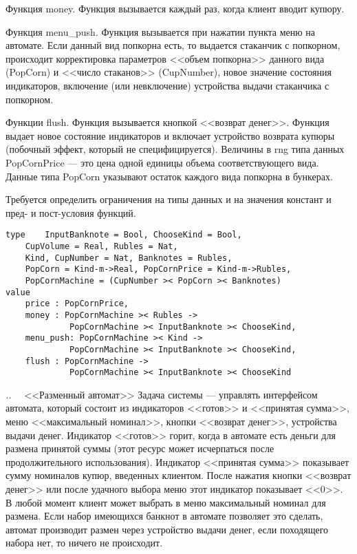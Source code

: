 \documentclass[14pt, twoside]{extreport}
\newcounter{problem_type}[chapter]
\newcounter{zadacha}[problem_type]
\newcommand{\z}{\vspace{0.5cm}\par\addtocounter{zadacha}{1}%
\textit{\arabic{chapter}.\arabic{problem_type}.\arabic{zadacha}}~~  }
\begin{document}
Функция money. Функция вызывается каждый раз, когда клиент вводит купюру.

Функция menu\_push. Функция вызывается при нажатии пункта меню на автомате. Если данный вид попкорна есть, то выдается стаканчик с попкорном, происходит корректировка параметров <<объем попкорна>> данного вида (PopCorn) и <<число стаканов>> (CupNumber), новое значение состояния индикаторов, включение (или невключение) устройства выдачи стаканчика с попкорном.

Функции flush. Функция вызывается кнопкой <<возврат денег>>. Функция выдает новое состояние индикаторов и включает устройство возврата купюры (побочный эффект, который не специфицируется).
Величины в rng типа данных PopCornPrice --- это цена одной единицы объема соответствующего вида. Данные типа PopCorn указывают остаток каждого вида попкорна в бункерах.

Требуется определить ограничения на типы данных и на значения констант и пред- и пост-условия функций.

\begin{lstlisting}
type	InputBanknote = Bool, ChooseKind = Bool,
    CupVolume = Real, Rubles = Nat,
	Kind, CupNumber = Nat, Banknotes = Rubles,
    PopCorn = Kind-m->Real, PopCornPrice = Kind-m->Rubles,
    PopCornMachine = (CupNumber >< PopCorn >< Banknotes)
value
	price : PopCornPrice, 	
	money : PopCornMachine >< Rubles ->
             PopCornMachine >< InputBanknote >< ChooseKind,
	menu_push: PopCornMachine >< Kind ->
             PopCornMachine >< InputBanknote >< ChooseKind,
	flush : PopCornMachine ->
             PopCornMachine >< InputBanknote >< ChooseKind
\end{lstlisting}

\z <<Разменный автомат>> Задача системы --- управлять интерфейсом автомата, который состоит из индикаторов <<готов>> и <<принятая сумма>>, меню <<максимальный номинал>>, кнопки <<возврат денег>>, устройства выдачи денег. Индикатор <<готов>> горит, когда в автомате есть деньги для размена принятой суммы (этот ресурс может исчерпаться после продолжительного использования). Индикатор <<принятая сумма>> показывает сумму номиналов купюр, введенных клиентом. После нажатия кнопки <<возврат денег>> или после удачного выбора меню этот индикатор показывает <<0>>. В любой момент клиент может выбрать в меню максимальный номинал для размена. Если набор имеющихся банкнот в автомате позволяет это сделать, автомат производит размен через устройство выдачи денег, если походящего набора нет, то ничего не происходит.
\end{document}
